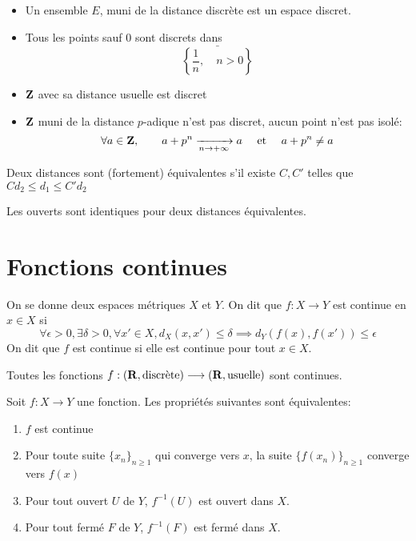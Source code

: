 \begin{ex}
    \begin{itemize}
        \item 
 Un ensemble  $E$, muni de la distance discrète est un espace discret.
 \item Tous les points sauf $0$ sont discrets dans  \[
         \bar{ \left\{ \frac{1}{n}, \quad n>0 \right\}  }
 \] 
 \item $\mathbf Z$ avec sa distance usuelle est discret
 \item $\mathbf Z$ muni de la distance $p$-adique n'est pas discret, aucun point n'est pas isolé:  \[
         \forall  a \in  \mathbf Z, \qquad  a+p^n \xrightarrow[n\to +\infty]{}a \quad  \text{ et } \quad a+p^n \neq a
 \]
    \end{itemize}
\end{ex}

\begin{dfn}
    Deux distances sont (fortement) équivalentes s'il existe $C, C'$ telles que  $Cd_2 \leq d_1 \leq  C'd_2$
\end{dfn}

\begin{exo}
Les ouverts sont identiques pour deux distances équivalentes.
\end{exo}

\section{Fonctions continues}

\begin{dfn}
On se donne deux espaces métriques $X$ et  $Y$. On dit que  $f:X \longrightarrow Y$ est continue en  $x \in X$ si \[
    \forall  \epsilon>0, \exists \delta >0, \forall  x' \in  X, d_X(x, x')\leq \delta \implies d_Y(f(x), f(x'))\leq  \epsilon
\] 
On dit que  $f$ est continue si elle est continue pour tout  $x \in  X$.
\end{dfn}

\begin{exo}
    Toutes les fonctions $f:(\mathbf R, \text{discrète}) \longrightarrow (\mathbf R, \text{usuelle})$ sont continues.
\end{exo}

\begin{thm}
Soit $f:X \longrightarrow Y$ une fonction. Les propriétés suivantes sont équivalentes:  \begin{enumerate}
    \item $f$ est continue
    \item  Pour toute suite $\{x_n\}_{n\geq 1}$ qui converge vers $x$, la suite  $\{f(x_n)\}_{n\geq 1}$ converge vers $f(x)$
    \item Pour tout ouvert  $U$ de  $Y$,  $f^{-1}(U)$ est ouvert dans $X$.
    \item Pour tout fermé  $F$ de  $Y$,  $f^{-1}(F)$ est fermé dans $X$.
\end{enumerate}
\end{thm}


